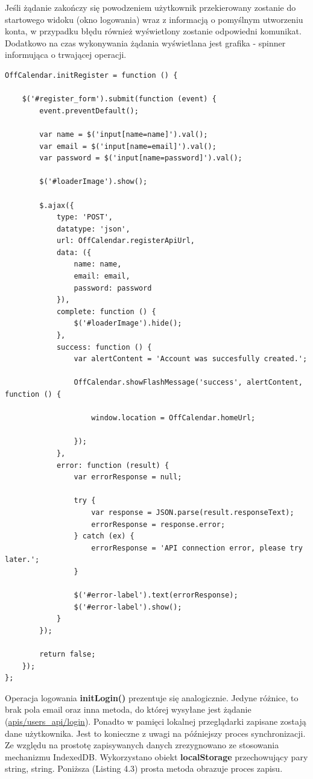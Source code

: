 Jeśli żądanie zakończy się powodzeniem użytkownik przekierowany zostanie do startowego widoku (okno logowania) wraz z informacją o pomyślnym utworzeniu konta, w przypadku błędu również wyświetlony zostanie odpowiedni komunikat. Dodatkowo na czas wykonywania żądania wyświetlana jest grafika - spinner informująca o trwającej operacji.

\begin{lstlisting}[style=js, caption=Kod metody initRegister odpowiedzialnej za rejestrację użytkownika z wykorzystaniem API., label=amb, captionpos=b]
OffCalendar.initRegister = function () {

    $('#register_form').submit(function (event) {
        event.preventDefault();

        var name = $('input[name=name]').val();
        var email = $('input[name=email]').val();
        var password = $('input[name=password]').val();

        $('#loaderImage').show();

        $.ajax({
            type: 'POST',
            datatype: 'json',
            url: OffCalendar.registerApiUrl,
            data: ({
                name: name,
                email: email,
                password: password
            }),
            complete: function () {
                $('#loaderImage').hide();
            },
            success: function () {
                var alertContent = 'Account was succesfully created.';

                OffCalendar.showFlashMessage('success', alertContent, function () {

                    window.location = OffCalendar.homeUrl;

                });
            },
            error: function (result) {
                var errorResponse = null;

                try {
                    var response = JSON.parse(result.responseText);
                    errorResponse = response.error;
                } catch (ex) {
                    errorResponse = 'API connection error, please try later.';
                }

                $('#error-label').text(errorResponse);
                $('#error-label').show();
            }
        });

        return false;
    });
};
\end{lstlisting}

Operacja logowania \textbf{initLogin()} prezentuje się analogicznie. Jedyne różnice, to brak pola email oraz inna metoda, do której wysyłane jest żądanie (\url{apis/users_api/login}). Ponadto w pamięci lokalnej przeglądarki zapisane zostają dane użytkownika. Jest to konieczne z uwagi na późniejszy proces synchronizacji. Ze względu na prostotę zapisywanych danych zrezygnowano ze stosowania mechanizmu IndexedDB. Wykorzystano obiekt \textbf{localStorage} przechowujący pary string, string. Poniższa (Listing 4.3) prosta metoda obrazuje proces zapisu.

